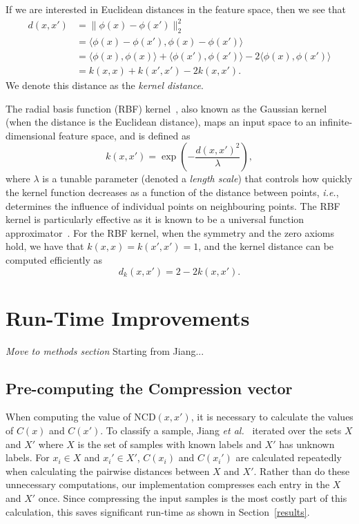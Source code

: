\documentclass[preprint,12pt]{article}
\newcommand{\cm}[1]{\textit{{\color{blue}#1}}}
\begin{document}
If we are interested in Euclidean distances in the feature space, then we see that
\begin{align*}
    d(x,x')
        &= \| \phi(x) - \phi(x') \|_2^2 \\ 
        &= \langle\phi(x) - \phi(x'), \phi(x) - \phi(x') \rangle \\
        &= \langle \phi(x), \phi(x) \rangle + \langle \phi(x'), \phi(x') \rangle - 2\langle \phi(x), \phi(x') \rangle \\
        &= k(x, x) + k(x', x') - 2k(x, x').
\end{align*}
We denote this distance as the \textit{kernel distance}.

\label{rbf_kernel}

The radial basis function (RBF) kernel~\cite{kernels}, also known as the Gaussian kernel (when the distance is the Euclidean distance), maps an input space to an infinite-dimensional feature space, and is defined as
$$
    k(x, x') = \exp\left(-\frac{d(x, x')^2}{\lambda}\right),
$$
where $\lambda$ is a tunable parameter (denoted a \textit{length scale}) that controls how quickly the kernel function decreases as a function of the distance between points, \textit{i.e.}, determines the influence of individual points on neighbouring points.
The RBF kernel is particularly effective as it is known to be a universal function approximator~\cite{}.
For the RBF kernel, when the symmetry and the zero axioms hold, we have that $k(x,x) = k(x',x') = 1$, and the kernel distance can be computed efficiently as
$$
    d_k(x, x') = 2 - 2 k(x, x').
$$



\section{Run-Time Improvements}
\cm{Move to methods section}
\label{improvements}
Starting from Jiang...



\subsection{Pre-computing the Compression vector}
\label{pre_compute_compression}

When computing the value of NCD$(x,x')$, it is necessary to calculate the values of $C(x)$ and $C(x')$. 
To classify a sample, Jiang \textit{et al.}~\cite{jiang2022less} iterated over the sets $X$ and $X'$ where $X$ is the set of samples with known labels and $X'$ has unknown labels. 
For $x_i \in X$ and $x_i' \in X'$, $C(x_i)$ and $C(x_i')$ are calculated repeatedly when calculating the pairwise distances between $X$ and $X'$.
Rather than do these unnecessary computations, our implementation compresses each entry in the $X$ and $X'$ once. 
Since compressing the input samples is the most costly part of this calculation, this saves significant run-time as shown in Section~\ref{results}.
\end{document}
